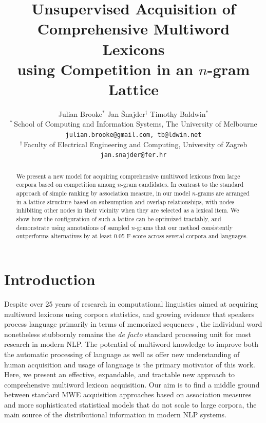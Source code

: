 \documentclass[11pt,letterpaper]{article}
\title{Unsupervised Acquisition of Comprehensive Multiword Lexicons \\ using Competition in an $n$-gram Lattice}
\author{
Julian Brooke$^{*}$ \quad Jan \v{S}najder$^{\dagger}$ \quad Timothy Baldwin$^{*}$ \\
$^{*}$\,School of Computing and Information Systems, The University of Melbourne\\
\texttt{julian.brooke@gmail.com, tb@ldwin.net} \\
$^{\dagger}$\,Faculty of Electrical Engineering and Computing, University
of Zagreb \\
\texttt{jan.snajder@fer.hr}\\
}
\date{}
\begin{document}
\maketitle


\begin{abstract}
We present a new model for acquiring comprehensive multiword lexicons from large corpora based on  competition among $n$-gram candidates. In contrast to the standard approach of simple ranking by association measure, in our model $n$-grams are arranged in a lattice structure based on subsumption and overlap relationships, with nodes inhibiting other nodes in their vicinity when they are selected as a lexical item. We show how the configuration of such a lattice can be optimized tractably, and demonstrate using annotations of sampled $n$-grams that our method consistently outperforms alternatives by at least 0.05 F-score across several corpora and languages.
\end{abstract}


\section{Introduction}

Despite over 25 years of research in computational linguistics aimed at acquiring multiword lexicons using corpora statistics, and growing evidence that speakers process language primarily in terms of memorized sequences \cite{Wray08}, the individual word nonetheless stubbornly remains the \textit{de facto} standard processing unit for most research in modern NLP. The potential of multiword knowledge to improve both the automatic processing of language as well as offer new understanding of human acquisition and usage of language is the primary motivator of this work. Here, we present an effective, expandable, and tractable new approach to comprehensive multiword lexicon acquisition. Our aim is to find a middle ground between standard MWE acquisition approaches based on association measures \cite{Ramisch14} and more sophisticated statistical models \cite{Newman12} that do not scale to large corpora, the main source of the distributional information in modern NLP systems.


\end{document}
